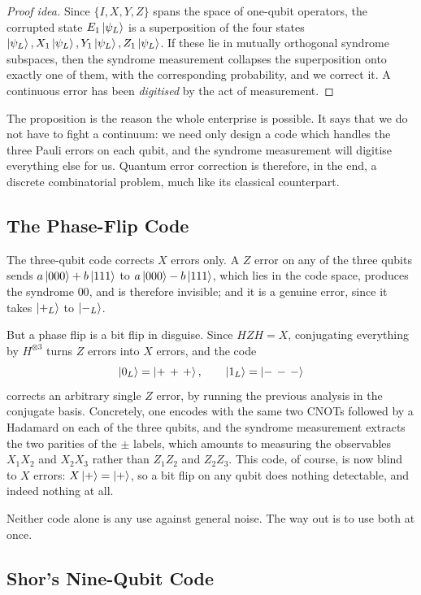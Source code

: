 \documentclass[a4paper]{scrartcl}
\begin{document}
\begin{proof}[Proof idea]
	Since $\{I,X,Y,Z\}$ spans the space of one-qubit operators, the corrupted state $E_1\ket{\psi_L}$ is a superposition of the four states $\ket{\psi_L}, X_1\ket{\psi_L},Y_1\ket{\psi_L},Z_1\ket{\psi_L}$. If these lie in mutually orthogonal syndrome subspaces, then the syndrome measurement collapses the superposition onto exactly one of them, with the corresponding probability, and we correct it. A continuous error has been \emph{digitised} by the act of measurement.
\end{proof}

The proposition is the reason the whole enterprise is possible. It says that we do not have to fight a continuum: we need only design a code which handles the three Pauli errors on each qubit, and the syndrome measurement will digitise everything else for us. Quantum error correction is therefore, in the end, a discrete combinatorial problem, much like its classical counterpart.

\subsection{The Phase-Flip Code}

The three-qubit code corrects $X$ errors only. A $Z$ error on any of the three qubits sends $a\ket{000}+b\ket{111}$ to $a\ket{000}-b\ket{111}$, which lies in the code space, produces the syndrome $00$, and is therefore invisible; and it is a genuine error, since it takes $\ket{+_L}$ to $\ket{-_L}$.

But a phase flip is a bit flip in disguise. Since $HZH = X$, conjugating everything by $H^{\otimes3}$ turns $Z$ errors into $X$ errors, and the code
$$\ket{0_L} = \ket{+\,+\,+}, \qquad \ket{1_L} = \ket{-\,-\,-}$$
corrects an arbitrary single $Z$ error, by running the previous analysis in the conjugate basis. Concretely, one encodes with the same two CNOTs followed by a Hadamard on each of the three qubits, and the syndrome measurement extracts the two parities of the $\pm$ labels, which amounts to measuring the observables $X_1X_2$ and $X_2X_3$ rather than $Z_1Z_2$ and $Z_2Z_3$. This code, of course, is now blind to $X$ errors: $X\ket{+} = \ket+$, so a bit flip on any qubit does nothing detectable, and indeed nothing at all.

Neither code alone is any use against general noise. The way out is to use both at once.

\subsection{Shor's Nine-Qubit Code}
\end{document}
